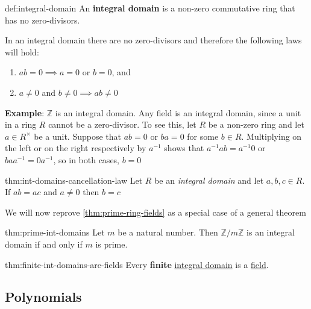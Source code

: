 \documentclass{article}
\begin{document}
\begin{dfn}{def:integral-domain}{}
    An \textbf{integral domain} is a non-zero commutative ring that has no zero-divisors.

    In an integral domain there are no zero-divisors and therefore the following laws will hold:
    \begin{enumerate}
        \item $ab = 0 \implies a = 0$ or $b = 0$, and
        \item $a\ne 0$ and $b\ne 0 \implies ab \ne 0$ 
    \end{enumerate}
\end{dfn}

\textbf{Example}: $\mathbb{Z}$ is an integral domain. Any field is an integral domain, since a unit in a ring $R$ cannot be a zero-divisor. To see this, let $R$ be a non-zero ring and let $a\in R^{\times}$ be a unit. Suppose that $ab = 0$ or $ba = 0$ for some $b\in R$. Multiplying on the left or on the right respectively by $a^{-1}$ shows that $a^{-1} ab = a^{-1} 0$ or $baa^{-1} = 0 a^{-1}$, so in both cases, $b = 0$

\begin{thm}{thm:int-domains-cancellation-law}{}
    Let $R$ be an \textit{integral domain} and let $a,b,c\in R$. If $ab = ac$ and $a\ne 0$ then $b = c$
\end{thm}

We will now reprove \ref{thm:prime-ring-fields} as a special case of a general theorem

\begin{thm}{thm:prime-int-domains}{}
    Let $m$ be a natural number. Then $\mathbb{Z} / m\mathbb{Z}$ is an integral domain if and only if $m$ is prime.
\end{thm}

\begin{thm}{thm:finite-int-domains-are-fields}{}
    Every \textbf{finite} \hyperref[def:integral-domain]{integral domain} is a \hyperref[def:field]{field}.
\end{thm}

\subsection{Polynomials}
\end{document}
